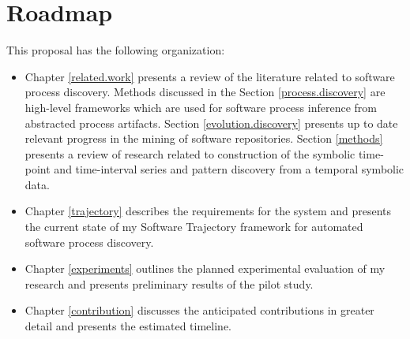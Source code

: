 \section{Roadmap}
This proposal has the following organization:
\begin{itemize}
	\item Chapter \ref{related.work} presents a review of the literature related to software process discovery. Methods discussed in the Section \ref{process.discovery} are high-level frameworks which are used for software process inference from abstracted process artifacts. Section \ref{evolution.discovery} presents up to date relevant progress in the mining of software repositories. Section \ref{methods} presents a review of research related to construction of the symbolic time-point and time-interval series and pattern discovery from a temporal symbolic data.
	\item Chapter \ref{trajectory} describes the requirements for the system and presents the current state of my Software Trajectory framework for automated software process discovery.
	\item Chapter \ref{experiments} outlines the planned experimental evaluation of my research and presents preliminary results of the pilot study.
	\item Chapter \ref{contribution} discusses the anticipated contributions in greater detail and presents the estimated timeline.
\end{itemize}
